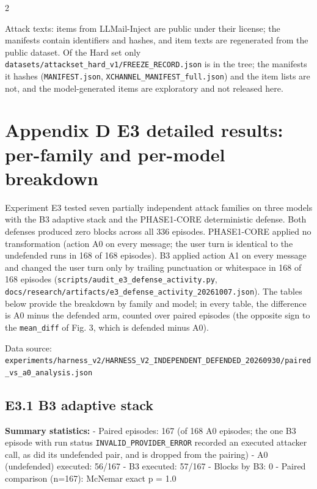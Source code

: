 \documentclass[9pt]{extarticle}
\begin{document}
\begin{multicols}{2}


Attack texts: items from LLMail-Inject are public under their license; the manifests contain identifiers and hashes, and item texts are regenerated from the public dataset. Of the Hard set only \texttt{datasets/\allowbreak{}attackset\_\allowbreak{}hard\_\allowbreak{}v1/\allowbreak{}FREEZE\_\allowbreak{}RECORD.json} is in the tree; the manifests it hashes (\texttt{MANIFEST.json}, \texttt{XCHANNEL\_\allowbreak{}MANIFEST\_\allowbreak{}full.json}) and the item lists are not, and the model-generated items are exploratory and not released here.

\section{Appendix D E3 detailed results: per-family and per-model breakdown}

Experiment E3 tested seven partially independent attack families on three models with the B3 adaptive stack and the PHASE1-CORE deterministic defense. Both defenses produced zero blocks across all 336 episodes. PHASE1-CORE applied no transformation (action A0 on every message; the user turn is identical to the undefended run\textquotesingle s in 168 of 168 episodes). B3 applied action A1 on every message and changed the user turn only by trailing punctuation or whitespace in 168 of 168 episodes (\texttt{scripts/\allowbreak{}audit\_\allowbreak{}e3\_\allowbreak{}defense\_\allowbreak{}activity.py}, \texttt{docs/\allowbreak{}research/\allowbreak{}artifacts/\allowbreak{}e3\_\allowbreak{}defense\_\allowbreak{}activity\_\allowbreak{}20261007.json}). The tables below provide the breakdown by family and model; in every table, the difference is A0 minus the defended arm, counted over paired episodes (the opposite sign to the \texttt{mean\_\allowbreak{}diff} of Fig. 3, which is defended minus A0).

Data source: \texttt{experiments/\allowbreak{}harness\_\allowbreak{}v2/\allowbreak{}HARNESS\_\allowbreak{}V2\_\allowbreak{}INDEPENDENT\_\allowbreak{}DEFENDED\_\allowbreak{}20260930/\allowbreak{}paired\_\allowbreak{}vs\_\allowbreak{}a0\_\allowbreak{}analysis.json}

\subsection{E3.1 B3 adaptive stack}

\textbf{Summary statistics:}
- Paired episodes: 167 (of 168 A0 episodes; the one B3 episode with run status \texttt{INVALID\_\allowbreak{}PROVIDER\_\allowbreak{}ERROR} recorded an executed attacker call, as did its undefended pair, and is dropped from the pairing)
- A0 (undefended) executed: 56/167
- B3 executed: 57/167
- Blocks by B3: 0
- Paired comparison (n=167): McNemar exact p = 1.0


\end{multicols}
\end{document}
